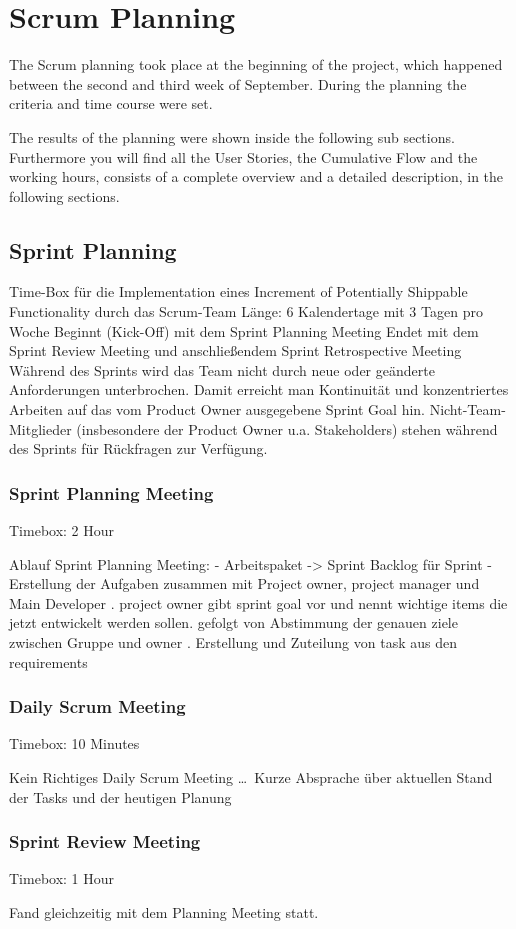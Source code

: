\section{Scrum Planning}
	The Scrum planning took place at the beginning of the project, which happened between the second and third week of September. During the planning the criteria and time course were set.
	
	The results of the planning were shown inside the following sub sections. Furthermore you will find all the User Stories, the Cumulative Flow and the working hours, consists of a complete overview and a detailed description, in the following sections.

	\subsection{Sprint Planning}


		Time-Box für die Implementation eines Increment of Potentially Shippable Functionality durch das Scrum-Team Länge: 6 Kalendertage mit 3 Tagen pro Woche
		Beginnt (Kick-Off) mit dem Sprint Planning Meeting
		Endet mit dem Sprint Review Meeting und anschließendem Sprint Retrospective Meeting
		Während des Sprints wird das Team nicht durch neue oder geänderte Anforderungen unterbrochen. Damit erreicht man Kontinuität und konzentriertes Arbeiten auf das vom Product Owner ausgegebene Sprint Goal hin.
		Nicht-Team-Mitglieder (insbesondere der Product Owner u.a. Stakeholders) stehen während des Sprints für Rückfragen zur Verfügung.

		\subsubsection{Sprint Planning Meeting}
		
		
			Timebox: 2 Hour

			Ablauf Sprint Planning Meeting:
				- Arbeitspaket -> Sprint Backlog für Sprint
				- Erstellung der Aufgaben zusammen mit Project owner, project manager und Main Developer
					. project owner gibt sprint goal vor und nennt wichtige items die jetzt entwickelt werden sollen. gefolgt von Abstimmung der genauen ziele zwischen Gruppe und owner
					. Erstellung und Zuteilung von task aus den requirements

		\subsubsection{Daily Scrum Meeting}
		
			Timebox: 10 Minutes
		
			Kein Richtiges Daily Scrum Meeting … Kurze Absprache über aktuellen Stand der Tasks und der heutigen Planung

		\subsubsection{Sprint Review Meeting}


			Timebox: 1 Hour

			Fand gleichzeitig mit dem Planning Meeting statt.